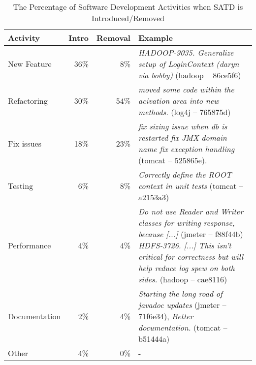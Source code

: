 \begin{table*}[tb]
  \caption{The Percentage of Software Development Activities when SATD is Introduced/Removed}
  \label{tab:percentage_activities} 
  \centering

  \begin{tabular}{l|r|r|p{2.80in}}
  \hline
       \textbf{Activity} & \textbf{Intro} & \textbf{Removal} & \textbf{Example} \\
  \hline
  New Feature &  36\%  &   8\% &  \textit{HADOOP-9035. Generalize setup of LoginContext (daryn via bobby)} (hadoop -- 86ce5f6) \\
  Refactoring &  30\%  &  54\% &  \textit{moved some code within the acivation area into new methods.} (log4j -- 765875d) \\
  Fix issues  &  18\%  &  23\% &  \textit{fix sizing issue when db is restarted fix JMX domain name fix exception handling} (tomcat -- 525865e). \\
  Testing     &   6\%  &   8\% &  \textit{Correctly define the ROOT context in unit tests} (tomcat -- a2153a3) \\
  Performance &   4\%  &   4\% &  \textit{Do not use Reader and Writer classes for writing response, because [...]} (jmeter -- f88f44b) \textit{HDFS-3726. [...] This isn't critical for correctness but will help reduce log spew on both sides.} (hadoop -- cae8116) \\ 
  Documentation & 2\%  &   4\% &  \textit{Starting the long road of javadoc updates} (jmeter -- 71f6e34), \textit{Better documentation.} (tomcat -- b51444a) \\
     
  Other\      &   4\%  &   0\% & -  \\%
  \hline
  \end{tabular}
\end{table*}